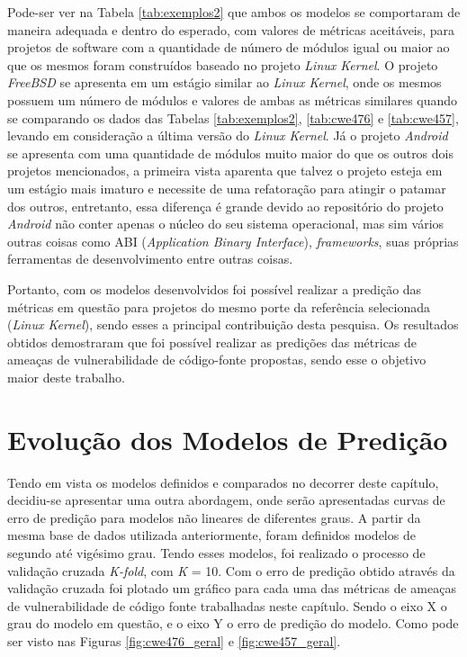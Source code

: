 Pode-ser ver na Tabela \ref{tab:exemplos2} que ambos os modelos se comportaram
de maneira adequada e dentro do esperado, com valores de métricas aceitáveis,
para projetos de software com a quantidade de número de módulos igual ou maior
ao que os mesmos foram construídos baseado no projeto \textit{Linux Kernel}. O
projeto \textit{FreeBSD} se apresenta em um estágio similar ao \textit{Linux
Kernel}, onde os mesmos possuem um número de módulos e valores de ambas as
métricas similares quando se comparando os dados das Tabelas
\ref{tab:exemplos2}, \ref{tab:cwe476} e \ref{tab:cwe457}, levando em
consideração a última versão do \textit{Linux Kernel}. Já o projeto
\textit{Android} se apresenta com uma quantidade de módulos muito maior do que
os outros dois projetos mencionados, a primeira vista aparenta que talvez o
projeto esteja em um estágio mais imaturo e necessite de uma refatoração para
atingir o patamar dos outros, entretanto, essa diferença é grande devido ao
repositório do projeto \textit{Android} não conter apenas o núcleo do seu
sistema operacional, mas sim vários outras coisas como ABI (\textit{Application
Binary Interface}), \textit{frameworks}, suas próprias ferramentas de
desenvolvimento entre outras coisas. 

Portanto, com os modelos desenvolvidos foi possível realizar a predição das
métricas em questão para projetos do mesmo porte da referência selecionada
(\textit{Linux Kernel}), sendo esses a principal contribuição desta pesquisa. Os
resultados obtidos demostraram que foi possível realizar
as predições das métricas de ameaças de vulnerabilidade de código-fonte
propostas, sendo esse o objetivo maior deste trabalho.


\section{Evolução dos Modelos de Predição}

Tendo em vista os modelos definidos e comparados no decorrer deste capítulo,
decidiu-se apresentar uma outra abordagem, onde serão apresentadas curvas de
erro de predição para modelos não lineares de diferentes graus. A partir da
mesma base de dados utilizada anteriormente, foram definidos modelos de segundo
até vigésimo grau. Tendo esses modelos, foi realizado o processo de validação
cruzada \textit{K-fold}, com \textit{K} = 10. Com o erro de predição obtido
através da validação cruzada foi plotado um gráfico para cada uma das métricas
de ameaças de vulnerabilidade de código fonte trabalhadas neste capítulo. Sendo
o eixo X o grau do modelo em questão, e o eixo Y o erro de predição do modelo.
Como pode ser visto nas Figuras \ref{fig:cwe476_geral} e \ref{fig:cwe457_geral}.

